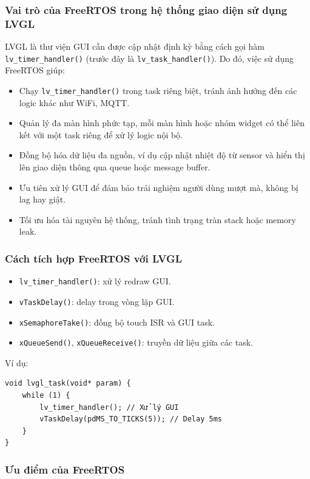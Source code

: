\subsubsection{Vai trò của FreeRTOS trong hệ thống giao diện sử dụng LVGL}
LVGL là thư viện GUI cần được cập nhật định kỳ bằng cách gọi hàm \texttt{lv\_timer\_handler()} (trước đây là \texttt{lv\_task\_handler()}). Do đó, việc sử dụng FreeRTOS giúp:
\begin{itemize}
    \item Chạy \texttt{lv\_timer\_handler()} trong task riêng biệt, tránh ảnh hưởng đến các logic khác như WiFi, MQTT.
    \item Quản lý đa màn hình phức tạp, mỗi màn hình hoặc nhóm widget có thể liên kết với một task riêng để xử lý logic nội bộ.
    \item Đồng bộ hóa dữ liệu đa nguồn, ví dụ cập nhật nhiệt độ từ sensor và hiển thị lên giao diện thông qua queue hoặc message buffer.
    \item Ưu tiên xử lý GUI để đảm bảo trải nghiệm người dùng mượt mà, không bị lag hay giật.
    \item Tối ưu hóa tài nguyên hệ thống, tránh tình trạng tràn stack hoặc memory leak.
\end{itemize}

\subsubsection{Cách tích hợp FreeRTOS với LVGL}

\begin{itemize}
    \item \texttt{lv\_timer\_handler()}: xử lý redraw GUI.
    \item \texttt{vTaskDelay()}: delay trong vòng lặp GUI.
    \item \texttt{xSemaphoreTake()}: đồng bộ touch ISR và GUI task.
    \item \texttt{xQueueSend()}, \texttt{xQueueReceive()}: truyền dữ liệu giữa các task.
\end{itemize}

Ví dụ:

\begin{verbatim}
void lvgl_task(void* param) {
    while (1) {
        lv_timer_handler(); // Xử lý GUI
        vTaskDelay(pdMS_TO_TICKS(5)); // Delay 5ms
    }
}
\end{verbatim}

\subsubsection{Ưu điểm của FreeRTOS}

